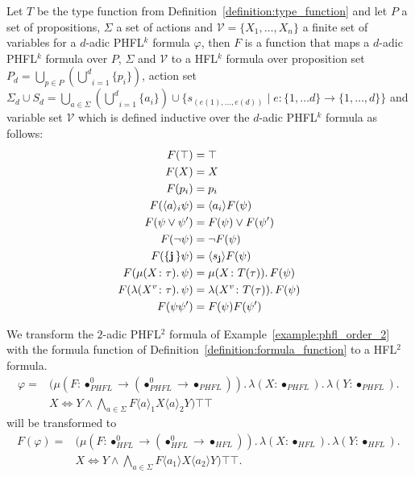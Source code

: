 \begin{definition}
    \label{definition:formula_function}
    Let $T$ be the type function from Definition~\ref{definition:type_function} and let $P$ a set of propositions,
    $\Sigma$ a set of actions and $\mathcal{V} = \{X_1, \dots, X_n\}$ a finite set of variables for a $d$-adic
    PHFL$^k$ formula $\varphi$, then $F$ is a function that maps a $d$-adic PHFL$^k$ formula over $P$, $\Sigma$ and
    $\mathcal{V}$ to a HFL$^k$ formula over proposition set $P_d = \underset{p \in P}{\bigcup}(\underset{i =
    1}{\overset{d}{\bigcup}} \{p_i\})$, action set $\Sigma_d \cup S_d = \underset{a \in \Sigma}{\bigcup}(\underset{i =
    1}{\overset{d}{\bigcup}} \{a_i\}) \cup \{s_{(e(1), \dots, e(d))} \mid e: \{1, \dots d\} \rightarrow \{1, \dots,
    d\}\}$ and variable set $\mathcal{V}$ which is defined inductive over the $d$-adic PHFL$^k$ formula as follows:
    \begin{align*}
        F(\top) &= \top\\
        F(X) &= X\\
        F(p_i) &= p_i\\
        F(\langle a \rangle_i \psi) &= \langle a_i \rangle F(\psi) \\
        F(\psi \vee \psi') &= F(\psi) \vee F(\psi') \\
        F(\neg \psi) &= \neg F(\psi) \\
        F(\{\emph{j}\,\} \psi) &= \langle s_{\emph{j}} \rangle F(\psi)  \\
        F(\mu (X \colon \tau).\,\psi) &= \mu (X \colon T(\tau)).\,F(\psi) \\
        F(\lambda (X^v \colon \tau).\, \psi) &= \lambda (X^v \colon T(\tau)).\, F(\psi) \\
        F(\psi{\psi'}) &= F(\psi)F({\psi'})
    \end{align*}
\end{definition}

\begin{example}
    We transform the $2$-adic PHFL$^2$ formula of Example~\ref{example:phfl_order_2} with the formula function of Definition~\ref{definition:formula_function} to a HFL$^2$ formula.
    \begin{align*}
        \varphi = &(\mu (F \colon \bullet_{PHFL}^0 \rightarrow (\bullet_{PHFL}^0 \rightarrow \bullet_{PHFL})).\,
        \lambda (X \colon \bullet_{PHFL}).\, \lambda (Y \colon \bullet_{PHFL}).\, \\&X \Leftrightarrow Y \wedge
        \underset{a \in \Sigma}{\bigwedge} F \langle a \rangle_1 X \langle a \rangle_2 Y)\top \top
    \end{align*}
    will be transformed to
\begin{align*}
    F(\varphi) = &(\mu (F \colon \bullet_{HFL}^0 \rightarrow (\bullet_{HFL}^0 \rightarrow \bullet_{HFL})).\,
    \lambda (X \colon \bullet_{HFL}).\, \lambda (Y \colon \bullet_{HFL}).\, \\&X \Leftrightarrow Y \wedge \underset{a
    \in \Sigma}{\bigwedge} F \langle a_1 \rangle X \langle a_2 \rangle Y)\top \top.
\end{align*}
\end{example}

